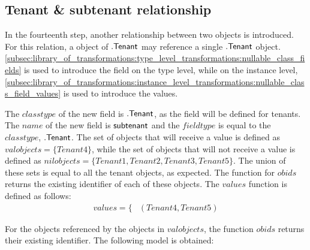 \subsection{Tenant \& subtenant relationship}
\label{sec:application:building_the_model:tenant_subtenant_relationship}

In the fourteenth step, another relationship between two objects is introduced. For this relation, a object of $.\mathsf{Tenant}$ may reference a single $.\mathsf{Tenant}$ object. \cref{subsec:library_of_transformations:type_level_transformations:nullable_class_fields} is used to introduce the field on the type level, while on the instance level, \cref{subsec:library_of_transformations:instance_level_transformations:nullable_class_field_values} is used to introduce the values.

The $classtype$ of the new field is $.\mathsf{Tenant}$, as the field will be defined for tenants. The $name$ of the new field is $\mathsf{subtenant}$ and the $fieldtype$ is equal to the $classtype$, $.\mathsf{Tenant}$. The set of objects that will receive a value is defined as $valobjects = \{Tenant4\}$, while the set of objects that will not receive a value is defined as $nilobjects = \{Tenant1, Tenant2, Tenant3, Tenant5\}$. The union of these sets is equal to all the tenant objects, as expected. The function for $obids$ returns the existing identifier of each of these objects. The $values$ function is defined as follows:
\begin{align*}
    values = \{&(Tenant4, Tenant5)
\end{align*}

For the objects referenced by the objects in $valobjects$, the function $obids$ returns their existing identifier. The following model is obtained:


